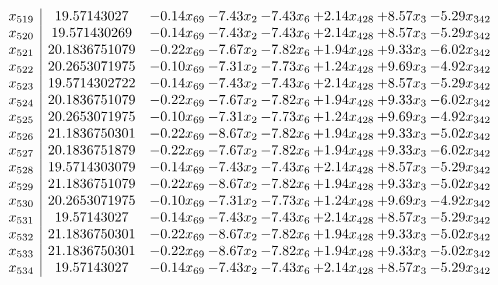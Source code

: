 \documentclass[8pt]{article}
\begin{document}
\[\begin{array}{c| c c@{\hskip 2pt} c@{\hskip 2pt} c@{\hskip 2pt} c@{\hskip 2pt} c@{\hskip 2pt} c@{\hskip 2pt} }
 x_{519}   &  19.57143027 & -0.14 x_{69} & -7.43 x_{2} & -7.43 x_{6} & +  2.14 x_{428} & +  8.57 x_{3} & -5.29 x_{342}\\
 x_{520}   &  19.571430269 & -0.14 x_{69} & -7.43 x_{2} & -7.43 x_{6} & +  2.14 x_{428} & +  8.57 x_{3} & -5.29 x_{342}\\
 x_{521}   &  20.1836751079 & -0.22 x_{69} & -7.67 x_{2} & -7.82 x_{6} & +  1.94 x_{428} & +  9.33 x_{3} & -6.02 x_{342}\\
 x_{522}   &  20.2653071975 & -0.10 x_{69} & -7.31 x_{2} & -7.73 x_{6} & +  1.24 x_{428} & +  9.69 x_{3} & -4.92 x_{342}\\
 x_{523}   &  19.5714302722 & -0.14 x_{69} & -7.43 x_{2} & -7.43 x_{6} & +  2.14 x_{428} & +  8.57 x_{3} & -5.29 x_{342}\\
 x_{524}   &  20.1836751079 & -0.22 x_{69} & -7.67 x_{2} & -7.82 x_{6} & +  1.94 x_{428} & +  9.33 x_{3} & -6.02 x_{342}\\
 x_{525}   &  20.2653071975 & -0.10 x_{69} & -7.31 x_{2} & -7.73 x_{6} & +  1.24 x_{428} & +  9.69 x_{3} & -4.92 x_{342}\\
 x_{526}   &  21.1836750301 & -0.22 x_{69} & -8.67 x_{2} & -7.82 x_{6} & +  1.94 x_{428} & +  9.33 x_{3} & -5.02 x_{342}\\
 x_{527}   &  20.1836751879 & -0.22 x_{69} & -7.67 x_{2} & -7.82 x_{6} & +  1.94 x_{428} & +  9.33 x_{3} & -6.02 x_{342}\\
 x_{528}   &  19.5714303079 & -0.14 x_{69} & -7.43 x_{2} & -7.43 x_{6} & +  2.14 x_{428} & +  8.57 x_{3} & -5.29 x_{342}\\
 x_{529}   &  21.1836751079 & -0.22 x_{69} & -8.67 x_{2} & -7.82 x_{6} & +  1.94 x_{428} & +  9.33 x_{3} & -5.02 x_{342}\\
 x_{530}   &  20.2653071975 & -0.10 x_{69} & -7.31 x_{2} & -7.73 x_{6} & +  1.24 x_{428} & +  9.69 x_{3} & -4.92 x_{342}\\
 x_{531}   &  19.57143027 & -0.14 x_{69} & -7.43 x_{2} & -7.43 x_{6} & +  2.14 x_{428} & +  8.57 x_{3} & -5.29 x_{342}\\
 x_{532}   &  21.1836750301 & -0.22 x_{69} & -8.67 x_{2} & -7.82 x_{6} & +  1.94 x_{428} & +  9.33 x_{3} & -5.02 x_{342}\\
 x_{533}   &  21.1836750301 & -0.22 x_{69} & -8.67 x_{2} & -7.82 x_{6} & +  1.94 x_{428} & +  9.33 x_{3} & -5.02 x_{342}\\
 x_{534}   &  19.57143027 & -0.14 x_{69} & -7.43 x_{2} & -7.43 x_{6} & +  2.14 x_{428} & +  8.57 x_{3} & -5.29 x_{342}\\

\end{array}\]
\end{document}
